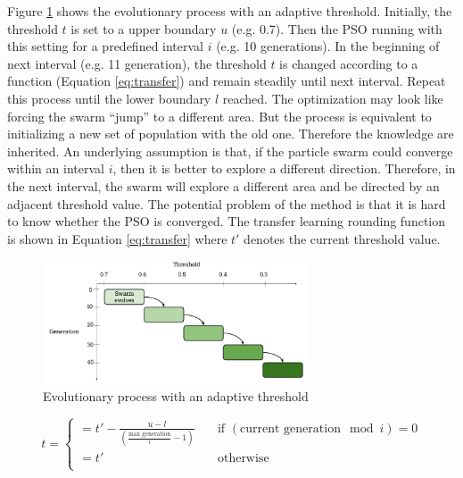 Figure \ref{fig:adaptive} shows the evolutionary process with an adaptive threshold.
Initially, the threshold $t$ is set to a upper boundary $u$ (e.g. 0.7). Then the PSO running with this setting for a 
predefined interval $i$ (e.g. 10 generations). In the beginning of next interval (e.g. 11 generation), the threshold $t$ is changed according to
a function (Equation \ref{eq:transfer}) and remain steadily until next interval. 
Repeat this process until the lower boundary $l$ reached. 
The optimization may look like forcing the swarm ``jump'' to a different area. But the process is equivalent to initializing a new set of population with 
the old one. Therefore the knowledge are inherited.
An underlying assumption
is that, if the particle swarm could converge within an interval $i$, then it is better to explore a different direction.
Therefore, in the next interval, the swarm will explore a different area and be directed by an adjacent threshold value. 
The potential problem of the method is that it is hard to know whether the PSO is converged.
The transfer learning rounding function is shown in Equation \ref{eq:transfer} where $t'$ denotes the current threshold value.
\begin{figure}[H]
 \centering
   \includegraphics[width=0.7\textwidth]{pics/transfer.png}
   \caption{Evolutionary process with an adaptive threshold}
   \label{fig:adaptive}
 \end{figure}
 
\begin{equation}
\label{eq:transfer}
		t = 
		\begin{cases}
		= t' - \frac{u - l}{(\frac{\text{max generation}}{i} - 1)} & \quad \text{if } (\text{current generation}\mod i) = 0\\
		= t' & \quad \text{otherwise} \\
		\end{cases}
\end{equation}


